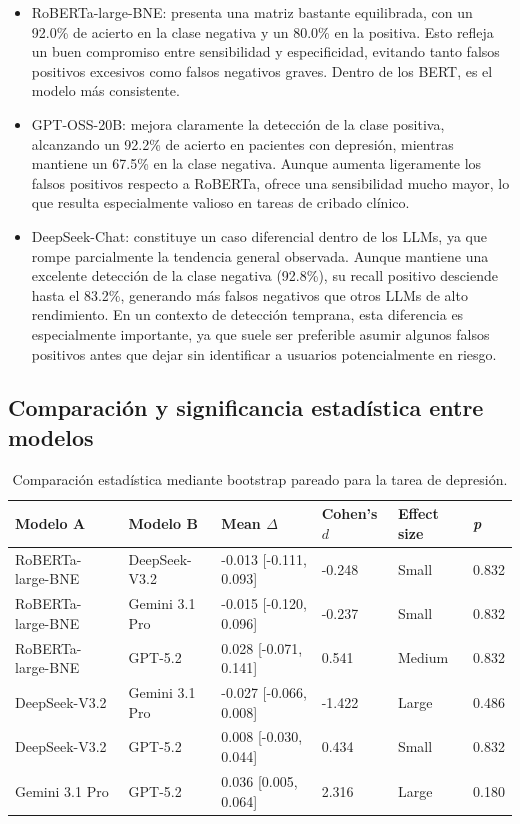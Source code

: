 \begin{itemize}
	
	\item RoBERTa-large-BNE: presenta una matriz bastante equilibrada, con un 92.0\% de acierto en la clase negativa y un 80.0\% en la positiva. Esto refleja un buen compromiso entre sensibilidad y especificidad, evitando tanto falsos positivos excesivos como falsos negativos graves. Dentro de los BERT, es el modelo más consistente.
	
	\item GPT-OSS-20B: mejora claramente la detección de la clase positiva, alcanzando un 92.2\% de acierto en pacientes con depresión, mientras mantiene un 67.5\% en la clase negativa. Aunque aumenta ligeramente los falsos positivos respecto a RoBERTa, ofrece una sensibilidad mucho mayor, lo que resulta especialmente valioso en tareas de cribado clínico.
	
	\item DeepSeek-Chat: constituye un caso diferencial dentro de los LLMs, ya que rompe parcialmente la tendencia general observada. Aunque mantiene una excelente detección de la clase negativa (92.8\%), su recall positivo desciende hasta el 83.2\%, generando más falsos negativos que otros LLMs de alto rendimiento. En un contexto de detección temprana, esta diferencia es especialmente importante, ya que suele ser preferible asumir algunos falsos positivos antes que dejar sin identificar a usuarios potencialmente en riesgo.
	
\end{itemize}

\subsection{Comparación y significancia estadística entre modelos}

\begin{table}[H]
	\centering
	\small
	\begin{tabular}{llllll}
		\hline
		\textbf{Modelo A} & \textbf{Modelo B} & \textbf{Mean $\Delta$} & \textbf{Cohen's $d$} & \textbf{Effect size} & \textbf{\textit{p}} \\
		\hline
		RoBERTa-large-BNE & DeepSeek-V3.2 & -0.013 [-0.111, 0.093] & -0.248 & Small & 0.832 \\
		RoBERTa-large-BNE & Gemini 3.1 Pro & -0.015 [-0.120, 0.096] & -0.237 & Small & 0.832 \\
		RoBERTa-large-BNE & GPT-5.2 & 0.028 [-0.071, 0.141] & 0.541 & Medium & 0.832 \\
		DeepSeek-V3.2 & Gemini 3.1 Pro & -0.027 [-0.066, 0.008] & -1.422 & Large & 0.486 \\
		DeepSeek-V3.2 & GPT-5.2 & 0.008 [-0.030, 0.044] & 0.434 & Small & 0.832 \\
		Gemini 3.1 Pro & GPT-5.2 & 0.036 [0.005, 0.064] & 2.316 & Large & 0.180 \\
		\hline
	\end{tabular}
	\caption{Comparación estadística mediante bootstrap pareado para la tarea de depresión.}
	\label{tab:bootstrap_depression}
\end{table}

